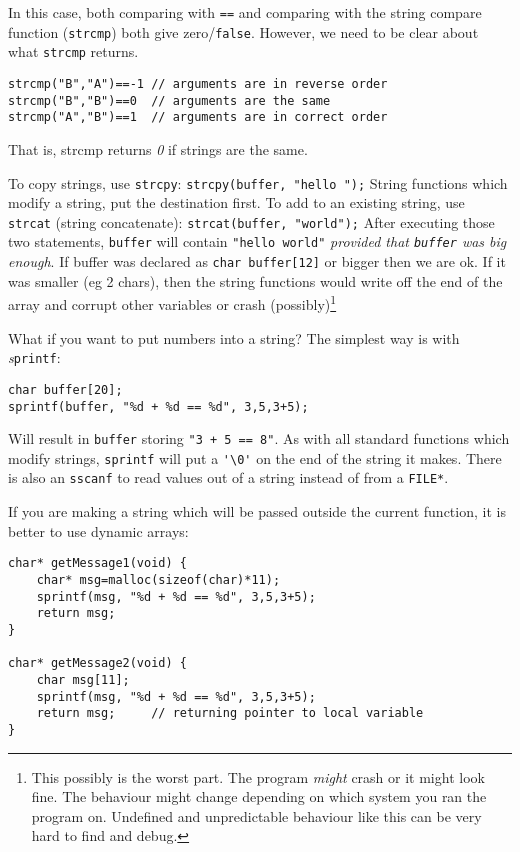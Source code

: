 In this case, both comparing with \texttt{==} and comparing with the string compare function (\texttt{strcmp}) both give zero/\lstinline!false!.
However, we need to be clear about what \texttt{strcmp} returns.
\begin{lstlisting}
strcmp("B","A")==-1 // arguments are in reverse order
strcmp("B","B")==0  // arguments are the same
strcmp("A","B")==1  // arguments are in correct order
\end{lstlisting}
That is, strcmp returns \emph{0} if strings are the same.

To copy strings, use \texttt{strcpy}:
\lstinline{strcpy(buffer, "hello ");}
String functions which modify a string, put the destination first.
To add to an existing string, use \texttt{strcat} (string concatenate):
\lstinline{strcat(buffer, "world");}
After executing those two statements, \texttt{buffer} will contain \lstinline!"hello world"! \emph{provided that \texttt{buffer} was big enough}.
If buffer was declared as \lstinline!char buffer[12]! or bigger then we are ok.
If it was smaller (eg 2 chars), then the string functions would write off the end of the array and corrupt other variables or crash (possibly)\footnote{This possibly is the worst part.
The program \emph{might} crash or it might look fine.
The behaviour might change depending on which system you ran the program on.
Undefined and unpredictable behaviour like this can be very hard to find and debug.}

What if you want to put numbers into a string? 
The simplest way is with \emph{s}\texttt{printf}:
\begin{lstlisting}
char buffer[20];
sprintf(buffer, "%d + %d == %d", 3,5,3+5);
\end{lstlisting}
Will result in \texttt{buffer} storing \lstinline!"3 + 5 == 8"!.
As with all standard functions which modify strings, \texttt{sprintf} will put a \lstinline!'\0'! on the end of the string it makes.
There is also an \texttt{sscanf} to read values out of a string instead of from a \texttt{FILE*}.

If you are making a string which will be passed outside the current function, it is better to use dynamic arrays:
\begin{lstlisting}
char* getMessage1(void) {
    char* msg=malloc(sizeof(char)*11);
    sprintf(msg, "%d + %d == %d", 3,5,3+5);
    return msg;
}

char* getMessage2(void) {
    char msg[11];
    sprintf(msg, "%d + %d == %d", 3,5,3+5);
    return msg;		// returning pointer to local variable
}
\end{lstlisting}

